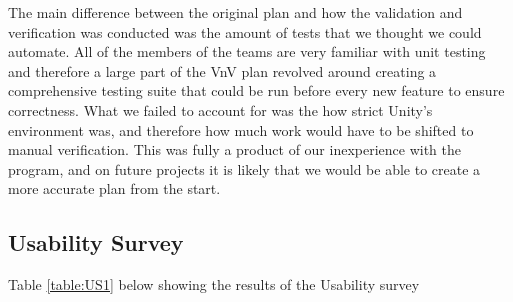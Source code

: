 \documentclass[12pt, titlepage]{article}
\begin{document}
The main difference between the original plan and how the validation and verification was conducted was the amount of tests that we thought we could automate. All of the members of the teams are very familiar with unit testing and therefore a large part of the VnV plan revolved around creating a comprehensive testing suite that could be run before every new feature to ensure correctness. What we failed to account for was the how strict Unity's environment was, and therefore how much work would have to be shifted to manual verification. This was fully a product of our inexperience with the program, and on future projects it is likely that we would be able to create a more accurate plan from the start. 



\subsection{Usability Survey}

Table \ref{table:US1} below showing the results of the Usability survey
\end{document}
